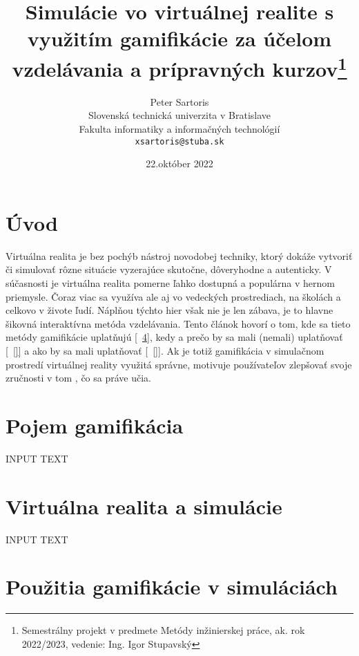 \documentclass[10pt,slovak,a4paper]{article}
\title{Simulácie vo virtuálnej realite s využitím gamifikácie za účelom vzdelávania a prípravných kurzov\thanks{Semestrálny projekt v predmete Metódy inžinierskej práce, ak. rok 2022/2023, vedenie: Ing. Igor Stupavský}}
\author{Peter Sartoris\\[2pt]
	{\small Slovenská technická univerzita v Bratislave}\\
	{\small Fakulta informatiky a informačných technológií}\\
	{\small \texttt{xsartoris@stuba.sk}}
	}
\date{\small 22.október 2022}
\begin{document}
\maketitle


\section{Úvod} \label{Abstract}

Virtuálna realita je bez pochýb nástroj novodobej techniky, ktorý dokáže vytvoriť či simulovať rôzne situácie vyzerajúce skutočne, dôveryhodne a autenticky.
V súčasnosti je virtuálna realita pomerne ľahko dostupná a populárna v hernom priemysle. Čoraz viac sa využíva ale aj vo vedeckých prostrediach, na školách a celkovo v živote ľudí. Náplňou týchto hier však nie je len zábava, je to hlavne šikovná interaktívna metóda vzdelávania.
Tento článok hovorí o tom, kde sa tieto metódy gamifikácie uplatňujú [~\ref{Uses}], kedy a prečo by sa mali (nemali) uplatňovať [~\ref{}] a ako by sa mali uplatňovať [~\ref{}]. Ak je totiž gamifikácia v simulačnom prostredí  virtuálnej reality využitá správne, motivuje používateľov zlepšovať svoje zručnosti v tom , čo sa práve učia.


\section{Pojem gamifikácia} \label{Gamification}

INPUT TEXT

\section{Virtuálna realita a simulácie} \label{Simulations}

INPUT TEXT

\section{Použitia gamifikácie v simuláciách} \label{Uses}
\end{document}
